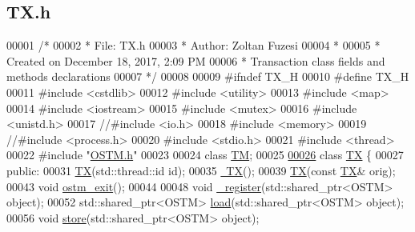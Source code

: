 \hypertarget{_t_x_8h_source}{}\subsection{T\+X.\+h}

\begin{DoxyCode}
00001 \textcolor{comment}{/* }
00002 \textcolor{comment}{ * File:   TX.h}
00003 \textcolor{comment}{ * Author: Zoltan Fuzesi}
00004 \textcolor{comment}{ * }
00005 \textcolor{comment}{ * Created on December 18, 2017, 2:09 PM}
00006 \textcolor{comment}{ * Transaction class fields and methods declarations}
00007 \textcolor{comment}{ */}
00008 
00009 \textcolor{preprocessor}{#ifndef TX\_H}
00010 \textcolor{preprocessor}{#define TX\_H}
00011 \textcolor{preprocessor}{#include <cstdlib>}
00012 \textcolor{preprocessor}{#include <utility>}
00013 \textcolor{preprocessor}{#include <map>}
00014 \textcolor{preprocessor}{#include <iostream>}
00015 \textcolor{preprocessor}{#include <mutex>}
00016 \textcolor{preprocessor}{#include <unistd.h>}
00017 \textcolor{comment}{//#include <io.h>}
00018 \textcolor{preprocessor}{#include <memory>}
00019 \textcolor{comment}{//#include <process.h>}
00020 \textcolor{preprocessor}{#include <stdio.h>}
00021 \textcolor{preprocessor}{#include <thread>}
00022 \textcolor{preprocessor}{#include "\hyperlink{_o_s_t_m_8h}{OSTM.h}"}
00023 
00024 \textcolor{keyword}{class }\hyperlink{class_t_m}{TM};
00025 
\hypertarget{_t_x_8h_source.tex_l00026}{}\hyperlink{class_t_x}{00026} \textcolor{keyword}{class }\hyperlink{class_t_x}{TX} \{
00027 \textcolor{keyword}{public}:
00031     \hyperlink{class_t_x_a8a4b83eab0171ae834bfa92bbced1094_a8a4b83eab0171ae834bfa92bbced1094}{TX}(std::thread::id \textcolor{keywordtype}{id});
00035     \hyperlink{class_t_x_abecf854cc3228ab6dd51175b3cd1c70a_abecf854cc3228ab6dd51175b3cd1c70a}{~TX}();
00039     \hyperlink{class_t_x_a8a4b83eab0171ae834bfa92bbced1094_a8a4b83eab0171ae834bfa92bbced1094}{TX}(\textcolor{keyword}{const} \hyperlink{class_t_x}{TX}& orig);
00043     \textcolor{keywordtype}{void} \hyperlink{class_t_x_aa9739c5c2077454c779098db7baefc2b_aa9739c5c2077454c779098db7baefc2b}{ostm\_exit}();
00044     
00048     \textcolor{keywordtype}{void} \hyperlink{class_t_x_abc32af2f51df97ac483e5bfe7db6ca6e_abc32af2f51df97ac483e5bfe7db6ca6e}{\_register}(std::shared\_ptr<OSTM>  \textcolor{keywordtype}{object});
00052     std::shared\_ptr<OSTM>  \hyperlink{class_t_x_a1d78262b8831ddd042ed491f2e600e24_a1d78262b8831ddd042ed491f2e600e24}{load}(std::shared\_ptr<OSTM>  \textcolor{keywordtype}{object});
00056     \textcolor{keywordtype}{void} \hyperlink{class_t_x_a7dbcb369aa4a3370b6c6829d278ece5d_a7dbcb369aa4a3370b6c6829d278ece5d}{store}(std::shared\_ptr<OSTM>  \textcolor{keywordtype}{object});

\end{DoxyCode}

